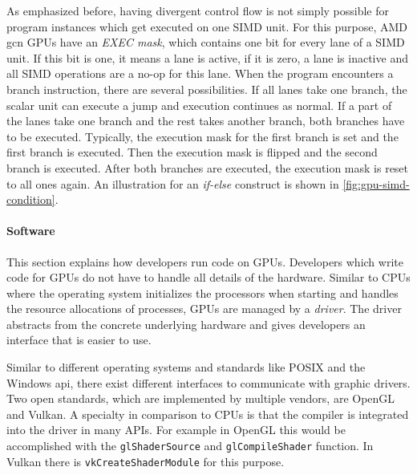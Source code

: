 As emphasized before, having divergent control flow is not simply possible for program instances which get executed on one SIMD unit. For this purpose, AMD \gls{gcn} GPUs have an \emph{EXEC mask}, which contains one bit for every lane of a SIMD unit. If this bit is one, it means a lane is active, if it is zero, a lane is inactive and all SIMD operations are a no-op for this lane. When the program encounters a branch instruction, there are several possibilities. If all lanes take one branch, the scalar unit can execute a jump and execution continues as normal. If a part of the lanes take one branch and the rest takes another branch, both branches have to be executed. Typically, the execution mask for the first branch is set and the first branch is executed. Then the execution mask is flipped and the second branch is executed. After both branches are executed, the execution mask is reset to all ones again. An illustration for an \emph{if-else} construct is shown in \cref{fig:gpu-simd-condition}.

\begin{figure}
	\centering
	
\end{figure}

\paragraph{Software} This section explains how developers run code on GPUs. Developers which write code for GPUs do not have to handle all details of the hardware. Similar to CPUs where the operating system initializes the processors when starting and handles the resource allocations of processes, GPUs are managed by a \emph{driver}. The driver abstracts from the concrete underlying hardware and gives developers an interface that is easier to use.

Similar to different operating systems and standards like POSIX and the Windows \gls{api}, there exist different interfaces to communicate with graphic drivers. Two open standards, which are implemented by multiple vendors, are OpenGL and Vulkan. A specialty in comparison to CPUs is that the compiler is integrated into the driver in many APIs. For example in OpenGL this would be accomplished with the \texttt{glShaderSource} and \texttt{glCompileShader} function. In Vulkan there is \texttt{vkCreateShaderModule} for this purpose.

